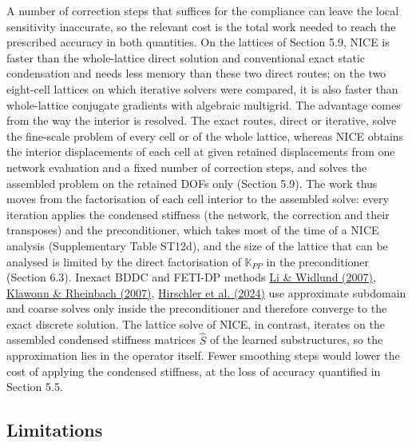 \documentclass[preprint,12pt,authoryear]{elsarticle}
\begin{document}
A number of correction steps that suffices for the compliance can leave the local sensitivity inaccurate, so the relevant cost is the total work needed to reach the prescribed accuracy in both quantities. On the lattices of Section 5.9, NICE is faster than the whole-lattice direct solution and conventional exact static condensation and needs less memory than these two direct routes; on the two eight-cell lattices on which iterative solvers were compared, it is also faster than whole-lattice conjugate gradients with algebraic multigrid. The advantage comes from the way the interior is resolved. The exact routes, direct or iterative, solve the fine-scale problem of every cell or of the whole lattice, whereas NICE obtains the interior displacements of each cell at given retained displacements from one network evaluation and a fixed number of correction steps, and solves the assembled problem on the retained DOFs only (Section 5.9). The work thus moves from the factorisation of each cell interior to the assembled solve: every iteration applies the condensed stiffness (the network, the correction and their transposes) and the preconditioner, which takes most of the time of a NICE analysis (Supplementary Table ST12d), and the size of the lattice that can be analysed is limited by the direct factorisation of \(\mathbb K_{PP}\) in the preconditioner (Section 6.3). Inexact BDDC and FETI-DP methods \href{https://doi.org/10.1016/j.cma.2006.03.011}{Li \& Widlund (2007)}, \href{https://doi.org/10.1002/nme.1758}{Klawonn \& Rheinbach (2007)}, \href{https://doi.org/10.1002/nme.7419}{Hirschler et al. (2024)} use approximate subdomain and coarse solves only inside the preconditioner and therefore converge to the exact discrete solution. The lattice solve of NICE, in contrast, iterates on the assembled condensed stiffness matrices \(\widehat S\) of the learned substructures, so the approximation lies in the operator itself. Fewer smoothing steps would lower the cost of applying the condensed stiffness, at the loss of accuracy quantified in Section 5.5.

\subsection{Limitations}
\end{document}
